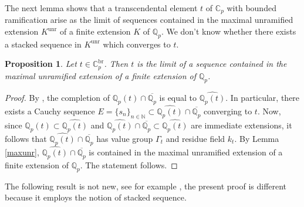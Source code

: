 \documentclass[10pt]{article}
\numberwithin{equation}{section}
\newtheorem{Prop}[equation]{Proposition}
\theoremstyle{definition}\newtheorem{Def}[equation]{Definition}
\theoremstyle{definition}\newtheorem{Ques}[equation]{Question}
\newcommand{\Q}{\mathbb{Q}}
\newcommand{\N}{\mathbb{N}}
\newcommand{\C}{\mathbb{C}}
\newcommand{\oQp}{\overline{\Q_p}}
\begin{document}
The next lemma shows that a transcendental element $t$ of $\C_p$ with bounded ramification arise as the limit of sequences contained in the maximal unramified extension $K^{\text{unr}}$ of a finite extension $K$ of $\Q_p$. We don't know whether there exists a stacked sequence in $K^{\text{unr}}$ which converges to $t$.

\begin{Prop}\label{elements bounded ramification}
Let $t\in\C_p^{\text{br}}$. Then $t$ is the limit of a  sequence contained in the maximal unramified extension of a finite extension of $\Q_p$.
\end{Prop}

\begin{proof}
By \cite[Theorem 1]{IovZah}, the completion of $\widehat{\Q_p(t)}\cap\oQp$ is equal to $\widehat{\Q_p(t)}$. In particular, there exists a Cauchy sequence $E=\{s_n\}_{n\in\N}\subset\widehat{\Q_p(t)}\cap\oQp$ converging to $t$. Now, since $\Q_p(t)\subset\widehat{\Q_p(t)}$ and $\widehat{\Q_p(t)}\cap\oQp\subset \widehat{\Q_p(t)}$ are immediate extensions, it follows that $\widehat{\Q_p(t)}\cap\oQp$ has value group $\Gamma_t$ and residue field $k_t$. By Lemma \ref{maxunr}, $\widehat{\Q_p(t)}\cap\oQp$ is contained in the maximal unramified extension of a finite extension of $\Q_p$. The statement follows.
\end{proof}

The following result is not new, see for example \cite[Lemma 2]{Lampert}, the present proof is different because it employs the notion of stacked sequence.
\end{document}
